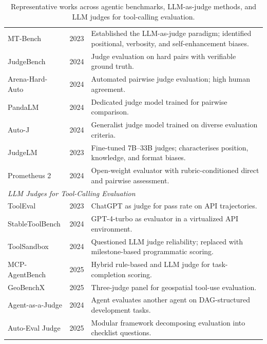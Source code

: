 \begin{table}[h!]
{\begin{tabular}{l l p{6cm}}
MT-Bench \citep{zheng2023judging} & 2023 & Established the LLM-as-judge paradigm; identified positional, verbosity, and self-enhancement biases. \\
JudgeBench \citep{tan2025judgebench} & 2024 & Judge evaluation on hard pairs with verifiable ground truth. \\
Arena-Hard-Auto \citep{li2024arenahard} & 2024 & Automated pairwise judge evaluation; high human agreement. \\
PandaLM \citep{wang2024pandalm} & 2024 & Dedicated judge model trained for pairwise comparison. \\
Auto-J \citep{li2024autoj} & 2024 & Generalist judge model trained on diverse evaluation criteria. \\
JudgeLM \citep{zhu2023judgelm} & 2023 & Fine-tuned 7B--33B judges; characterises position, knowledge, and format biases. \\
Prometheus 2 \citep{kim2024prometheus2} & 2024 & Open-weight evaluator with rubric-conditioned direct and pairwise assessment. \\
\midrule
\multicolumn{3}{l}{\textit{LLM Judges for Tool-Calling Evaluation}} \\
\midrule
ToolEval \citep{qin2024toolllm} & 2023 & ChatGPT as judge for pass rate on API trajectories. \\
StableToolBench \citep{guo2024stabletoolbench} & 2024 & GPT-4-turbo as evaluator in a virtualized API environment. \\
ToolSandbox \citep{lu2024toolsandbox} & 2024 & Questioned LLM judge reliability; replaced with milestone-based programmatic scoring. \\
MCP-AgentBench \citep{guo2025mcpagentbench} & 2025 & Hybrid rule-based and LLM judge for task-completion scoring. \\
GeoBenchX \citep{krechetova2025geobenchx} & 2025 & Three-judge panel for geospatial tool-use evaluation. \\
Agent-as-a-Judge \citep{zhuge2024agentjudge} & 2024 & Agent evaluates another agent on DAG-structured development tasks. \\
Auto-Eval Judge \citep{bhonsle2025autoeval} & 2025 & Modular framework decomposing evaluation into checklist questions. \\
\bottomrule
\end{tabular}%
}
\caption{Representative works across agentic benchmarks, LLM-as-judge methods, and LLM judges for tool-calling evaluation.}
\label{tab:overview}

\end{table}
